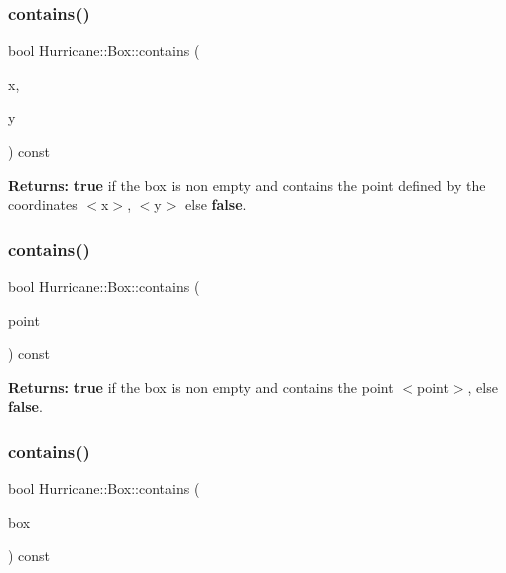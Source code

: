 \subsubsection{\texorpdfstring{contains()}{contains()}\hspace{0.1cm}{\footnotesize\ttfamily [1/3]}}
{\footnotesize\ttfamily bool Hurricane\+::\+Box\+::contains (\begin{DoxyParamCaption}\item[{const \mbox{\hyperlink{group__DbUGroup_ga4fbfa3e8c89347af76c9628ea06c4146}{Db\+U\+::\+Unit}} \&}]{x,  }\item[{const \mbox{\hyperlink{group__DbUGroup_ga4fbfa3e8c89347af76c9628ea06c4146}{Db\+U\+::\+Unit}} \&}]{y }\end{DoxyParamCaption}) const}

{\bfseries Returns\+:} {\bfseries true} if the box is non empty and contains the point defined by the coordinates {\ttfamily $<$x$>$}, {\ttfamily $<$y$>$} else {\bfseries false}. \mbox{\label{classHurricane_1_1Box_a19ad23904fbfe2afb3683affeb2cac7e}} 
\subsubsection{\texorpdfstring{contains()}{contains()}\hspace{0.1cm}{\footnotesize\ttfamily [2/3]}}
{\footnotesize\ttfamily bool Hurricane\+::\+Box\+::contains (\begin{DoxyParamCaption}\item[{const \mbox{\hyperlink{classHurricane_1_1Point}{Point}} \&}]{point }\end{DoxyParamCaption}) const}

{\bfseries Returns\+:} {\bfseries true} if the box is non empty and contains the point {\ttfamily $<$point$>$}, else {\bfseries false}. \mbox{\label{classHurricane_1_1Box_ac567c569f23643e58867afee80f6920a}} 
\subsubsection{\texorpdfstring{contains()}{contains()}\hspace{0.1cm}{\footnotesize\ttfamily [3/3]}}
{\footnotesize\ttfamily bool Hurricane\+::\+Box\+::contains (\begin{DoxyParamCaption}\item[{const \mbox{\hyperlink{classHurricane_1_1Box}{Box}} \&}]{box }\end{DoxyParamCaption}) const}

